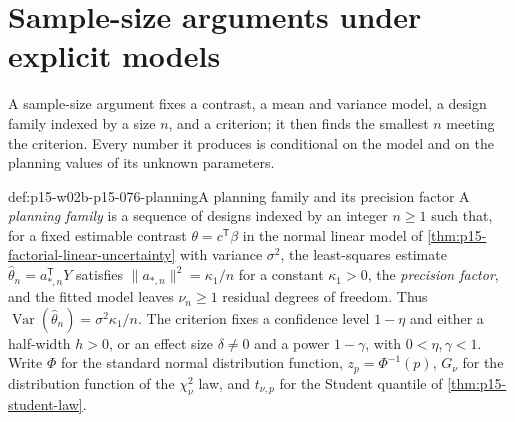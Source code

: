 \section{Sample-size arguments under explicit models}
\label{sec:p15-w02b-p15-076-sample-size}

A sample-size argument fixes a contrast, a mean and variance model, a
design family indexed by a size \(n\), and a criterion; it then finds the
smallest \(n\) meeting the criterion. Every number it produces is
conditional on the model and on the planning values of its unknown
parameters.

\begin{hbdefinition}{def:p15-w02b-p15-076-planning}{A planning family and its precision factor}
A \emph{planning family} is a sequence of designs indexed by an integer
\(n\geq1\) such that, for a fixed estimable contrast \(\theta=c^{\mathsf
T}\beta\) in the normal linear model of
\cref{thm:p15-factorial-linear-uncertainty} with variance \(\sigma^2\),
the least-squares estimate \(\widehat\theta_n=a_{*,n}^{\mathsf T}Y\)
satisfies \(\|a_{*,n}\|^2=\kappa_1/n\) for a constant
\(\kappa_1>0\), the \emph{precision factor}, and the fitted model leaves
\(\nu_n\geq1\) residual degrees of freedom. Thus
\(\operatorname{Var}(\widehat\theta_n)=\sigma^2\kappa_1/n\). The criterion
fixes a confidence level \(1-\eta\) and either a half-width \(h>0\), or an
effect size \(\delta\ne0\) and a power \(1-\gamma\), with
\(0<\eta,\gamma<1\). Write \(\Phi\) for the standard normal distribution
function, \(z_p=\Phi^{-1}(p)\), \(G_\nu\) for the distribution function of
the \(\chi^2_\nu\) law, and \(t_{\nu,p}\) for the Student quantile of
\cref{thm:p15-student-law}.
\end{hbdefinition}

